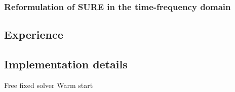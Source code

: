 \subsubsection{Reformulation of SURE in the time-frequency domain}


\subsection{Experience}
\label{sub:experience}
%

\subsection{Implementation details}
\label{sub:experience}
%
Free fixed solver
Warm start

\clearpage
